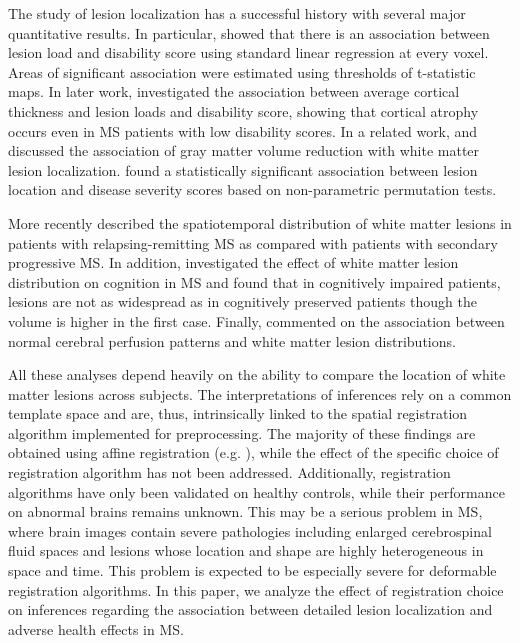 \documentclass[10pt]{article}
\begin{document}
The study of lesion localization has a successful history with
several major quantitative results. In particular,
\cite{charil2003statistical} showed that there is an association
between lesion load and disability  score using standard linear
regression at every voxel. Areas of significant association were
estimated using thresholds of t-statistic maps. In later work,
\cite{charil2007focal} investigated the association between average
cortical thickness and lesion loads and disability score, showing
that cortical atrophy occurs even in MS patients with low disability
scores. In a related work, \cite{sepulcre2009contribution} and \cite{bendfeldt2010spatiotemporal} discussed the association of gray matter volume reduction with white matter lesion localization. \cite{vellinga2009clinical}  found a statistically significant association between lesion location and disease severity scores based on non-parametric permutation tests. 

More recently \cite{filli2012spatiotemporal} described the spatiotemporal distribution of white matter lesions in patients with relapsing-remitting MS as compared with patients with secondary progressive MS. In addition, \cite{rossi2012relevance} investigated the effect of white matter lesion distribution on cognition in MS and  found that in cognitively impaired patients, lesions are not as widespread as in cognitively preserved patients though the volume is higher in the first case.  Finally, \cite{holland2012relationship} commented on the association between normal cerebral perfusion patterns and white matter lesion distributions. 

All these analyses depend heavily on the ability to compare
the location of white matter lesions across subjects. The interpretations of inferences rely on a common template space and are, thus, intrinsically linked to the spatial registration
algorithm implemented for preprocessing. The majority of these findings are obtained using affine registration (e.g. \cite{ashburner1997incorporating}), while the effect of the specific choice of registration algorithm has not been addressed. Additionally, registration
algorithms have only been validated on healthy controls, while their
performance on abnormal brains remains unknown. This may be a
serious problem in MS, where brain images contain severe pathologies
including enlarged cerebrospinal fluid spaces and lesions whose location and shape
are highly heterogeneous in space and time. This problem is expected to be especially severe for deformable registration algorithms. In this paper, we analyze the effect of registration choice on inferences regarding the association between detailed lesion localization
and adverse health effects in MS.
\end{document}
